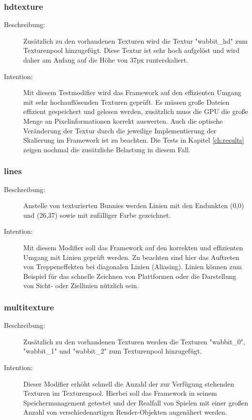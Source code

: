 \subsubsection{hdtexture}
\begin{description}
\item[Beschreibung:] Zusätzlich zu den vorhandenen Texturen wird die Textur "wabbit\_hd" zum Texturenpool hinzugefügt. Diese Textur ist sehr hoch aufgelöst und wird daher am Anfang auf die Höhe von 37px runterskaliert. \\
\item[Intention:] Mit diesem Testmodifier wird das Framework auf den effizienten Umgang mit sehr \mbox{hochauflösenden} Texturen geprüft. Es müssen große Dateien effizient gespeichert und gelesen werden, zusätzlich muss die GPU die große Menge an Pixelinformationen korrekt auswerten. Auch die optische Veränderung der Textur durch die jeweilige Implementierung der Skalierung im Framework ist zu beachten. Die Tests in Kapitel \ref{ch:results} zeigen nochmal die zusätzliche Belastung in diesem Fall.
\end{description} 
 
\subsubsection{lines}
\begin{description}
\item[Beschreibung:] Anstelle von texturierten Bunnies werden Linien mit den Endunkten (0,0) und (26,37) sowie mit zufälliger Farbe gezeichnet. \\
\item[Intention:] Mit diesem Modifier soll das Framework auf den korrekten und effizienten Umgang mit Linien geprüft werden. Zu beachten sind hier das Auftreten von Treppeneffekten bei diagonalen Linien (Aliasing). Linien können zum Beispiel für das schnelle Zeichnen von Plattformen oder die Darstellung von Sicht- oder Ziellinien nützlich sein.
\end{description}

\subsubsection{multitexture}
\begin{description}
\item[Beschreibung:] Zusätzlich zu den vorhandenen Texturen werden die Texturen "wabbit\_0", "wabbit\_1" und "wabbit\_2" zum Texturenpool hinzugefügt. \\
\item[Intention:] Dieser Modifier erhöht schnell die Anzahl der zur Verfügung stehenden Texturen im Texturenpool. Hierbei soll das Framework in seinem Speichermanagement getestet und der Realfall von Spielen mit einer großen Anzahl von verschiedenartigen Render-Objekten angenähert werden.
\end{description}


